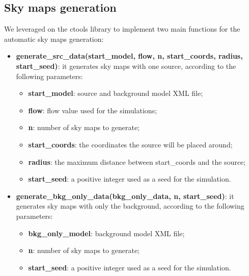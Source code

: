 \documentclass[a4paper,12pt,oneside]{book}
\begin{document}
\begin{onehalfspace}
	\section{Sky maps generation}
	We leveraged on the ctools library to implement two main functions for the automatic sky maps generation:
	\begin{itemize}
	    \setlength\itemsep{0em}
    	\item \textbf{generate\_src\_data(start\_model, flow, n, start\_coords, radius, start\_seed)}: it generates sky maps with one source, according to the following parameters:
    	\begin{itemize}
    	    \setlength\itemsep{0em}
        	\item \textbf{start\_model}: source and background model XML file;
        	\item \textbf{flow}: flow value used for the simulations;
        	\item \textbf{n}: number of sky maps to generate;
        	\item \textbf{start\_coords}: the coordinates the source will be placed around;
        	\item \textbf{radius}: the maximum distance between start\_coords and the source;
        	\item \textbf{start\_seed}: a positive integer used as a seed for the simulation.
    	\end{itemize}
		\item \textbf{generate\_bkg\_only\_data(bkg\_only\_data, n, start\_seed)}: it generates sky maps with only the background,
        according to the following parameters:
        \begin{itemize}
            \setlength\itemsep{0em}
        	\item \textbf{bkg\_only\_model}: background model XML file;
            \item \textbf{n}: number of sky maps to generate;
        	\item \textbf{start\_seed}: a positive integer used as a seed for the simulation.
    	\end{itemize}
	\end{itemize}
	

\end{onehalfspace}
\end{document}
